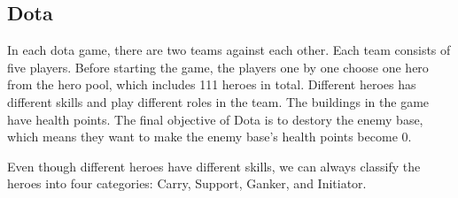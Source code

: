 \documentclass{article}
\begin{document}
\subsection{Dota}
In each dota game, there are two teams against each other.
Each team consists of five players.
Before starting the game, the players one by one choose one hero from the hero pool, which includes 111 heroes in total.
Different heroes has different skills and play different roles in the team.
The buildings in the game have health points.
The final objective of Dota is to destory the enemy base, which means they want to make the enemy base's health points become 0. 

Even though different heroes have different skills, we can always classify the heroes into four categories: Carry, Support, Ganker, and Initiator.
\end{document}
